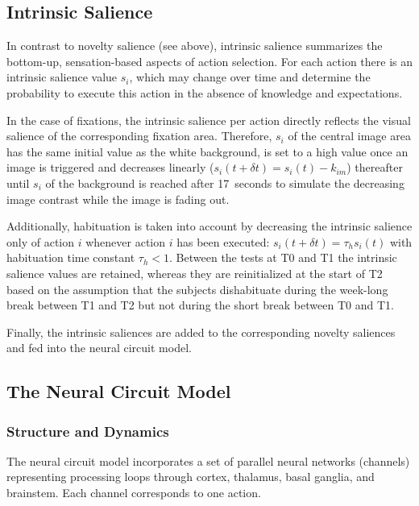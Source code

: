 \documentclass[a4paper]{scrreprt}
\begin{document}
\subsection{Intrinsic Salience}
\label{sec:int_sal}

In contrast to novelty salience (see above), intrinsic salience summarizes the bottom-up, sensation-based aspects of action selection. For each action there is an intrinsic salience value $s_i$, which may change over time and determine the probability to execute this action in the absence of knowledge and expectations.

In the case of fixations, the intrinsic salience per action directly reflects the visual salience of the corresponding fixation area. Therefore, $s_i$ of the central image area has the same initial value as the white background, is set to a high value once an image is triggered and decreases linearly ($s_i(t+\delta t) = s_i(t) - k_{im}$) thereafter until $s_i$ of the background is reached after 17~seconds to simulate the decreasing image contrast while the image is fading out.

Additionally, habituation is taken into account by decreasing the intrinsic salience only of action $i$ whenever action $i$ has been executed: $s_i(t+\delta t) = \tau_h s_i(t)$ with habituation time constant $\tau_h < 1$. Between the tests at T0 and T1 the intrinsic salience values are retained, whereas they are reinitialized at the start of T2 based on the assumption that the subjects dishabituate during the week-long break between T1 and T2 but not during the short break between T0 and T1.

Finally, the intrinsic saliences are added to the corresponding novelty saliences and fed into the neural circuit model.



\subsection{The Neural Circuit Model}
\label{sec:neural_circuit}

\subsubsection{Structure and Dynamics}

The neural circuit model incorporates a set of parallel neural networks (channels) representing processing loops through cortex, thalamus, basal ganglia, and brainstem. Each channel corresponds to one action.%
\end{document}
